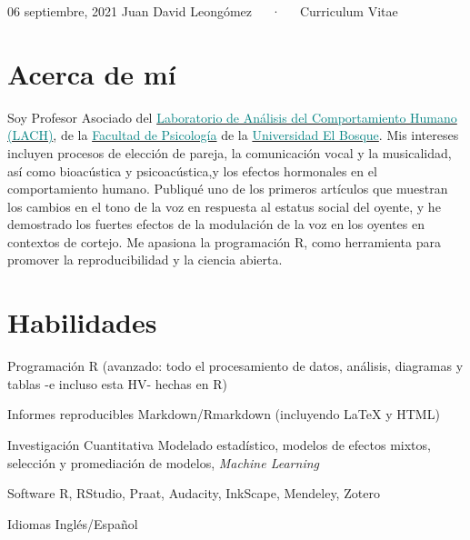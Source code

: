 \documentclass[11pt, a4paper]{awesome-cv}
\begin{document}
\makecvheader

\makecvfooter
  {06 septiembre, 2021}
    {Juan David Leongómez~~~·~~~Curriculum Vitae}
  {\thepage}





\hypertarget{acerca-de-muxed}{%
\section{Acerca de mí}\label{acerca-de-muxed}}

Soy Profesor Asociado del
\href{https://www.psicologia.unbosque.edu.co/lach}{\textcolor{teal}{Laboratorio de Análisis del Comportamiento Humano (LACH)}},
de la
\href{https://www.uelbosque.edu.co/psicologia}{\textcolor{teal}{Facultad de Psicología}}
de la
\href{https://www.uelbosque.edu.co/}{\textcolor{teal}{Universidad El Bosque}}.
Mis intereses incluyen procesos de elección de pareja, la comunicación
vocal y la musicalidad, así como bioacústica y psicoacústica,y los
efectos hormonales en el comportamiento humano. Publiqué uno de los
primeros artículos que muestran los cambios en el tono de la voz en
respuesta al estatus social del oyente, y he demostrado los fuertes
efectos de la modulación de la voz en los oyentes en contextos de
cortejo. Me apasiona la programación R, como herramienta para promover
la reproducibilidad y la ciencia abierta.

\hypertarget{habilidades}{%
\section{Habilidades}\label{habilidades}}

\begin{cvskills}
  \cvskill
    {Programación}
    {R (avanzado: todo el procesamiento de datos, análisis, diagramas y tablas -e incluso esta HV- hechas en R)}

  \cvskill
    {Informes reproducibles}
    {Markdown/Rmarkdown (incluyendo {\selectfont\LaTeX} y HTML)}

  \cvskill
    {Investigación Cuantitativa}
    {Modelado estadístico, modelos de efectos mixtos, selección y promediación de modelos, \textit{Machine Learning}}

  \cvskill
    {Software}
    {R, RStudio, Praat, Audacity, InkScape, Mendeley, Zotero}

  \cvskill
    {Idiomas}
    {Inglés/Español}
\end{cvskills}
\end{document}
